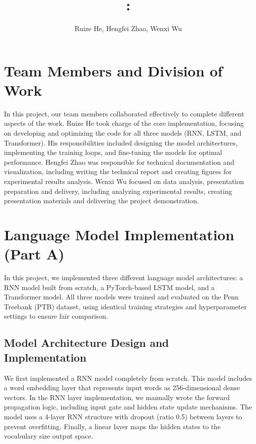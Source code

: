 \documentclass[12pt,oneside]{article}
\title{\textmd{\bf \Class: \Title}}
\date{}
\author{Ruize He, Hengfei Zhao, Wenxi Wu}
\begin{document}
\thispagestyle{empty}
\maketitle
\vspace{-1em}  %

\section{Team Members and Division of Work}

In this project, our team members collaborated effectively to complete different aspects of the work. Ruize He took charge of the core implementation, focusing on developing and optimizing the code for all three models (RNN, LSTM, and Transformer). His responsibilities included designing the model architectures, implementing the training loops, and fine-tuning the models for optimal performance. Hengfei Zhao was responsible for technical documentation and visualization, including writing the technical report and creating figures for experimental results analysis. Wenxi Wu focused on data analysis, presentation preparation and delivery, including analyzing experimental results, creating presentation materials and delivering the project demonstration.

\section{Language Model Implementation (Part A)}

In this project, we implemented three different language model architectures: a RNN model built from scratch, a PyTorch-based LSTM model, and a Transformer model. All three models were trained and evaluated on the Penn Treebank (PTB) dataset, using identical training strategies and hyperparameter settings to ensure fair comparison.

\subsection{Model Architecture Design and Implementation}

We first implemented a RNN model completely from scratch. This model includes a word embedding layer that represents input words as 256-dimensional dense vectors. In the RNN layer implementation, we manually wrote the forward propagation logic, including input gate and hidden state update mechanisms. The model uses a 4-layer RNN structure with dropout (ratio 0.5) between layers to prevent overfitting. Finally, a linear layer maps the hidden states to the vocabulary size output space.
\end{document}
